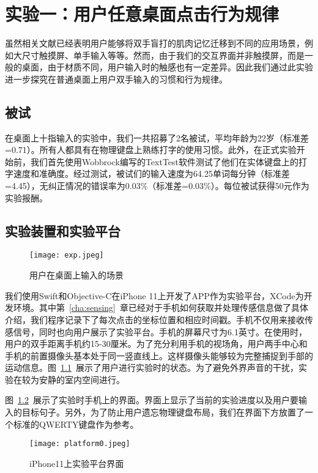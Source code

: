 \chapter{实验一：用户任意桌面点击行为规律}
\label{cha:exp1}
虽然相关文献已经表明用户能够将双手盲打的肌肉记忆迁移到不同的应用场景，例如大尺寸触摸屏、单手输入等等。然而，由于我们的交互界面并非触摸屏，而是一般的桌面，由于材质不同，用户输入时的触感也有一定差异。因此我们通过此实验进一步探究在普通桌面上用户双手输入的习惯和行为规律。


\section{被试}
在桌面上十指输入的实验中，我们一共招募了2名被试，平均年龄为22岁（标准差=0.71）。所有人都具有在物理键盘上熟练打字的使用习惯。此外，在正式实验开始前，我们首先使用Wobbrock编写的TextTest软件\cite{texttest}\cite{wobbrock2006analyzing}测试了他们在实体键盘上的打字速度和准确度。经过测试，被试们的输入速度为64.25单词每分钟（标准差=4.45），无纠正情况的错误率为0.03\%（标准差=0.03\%）。每位被试获得50元作为实验报酬。

\section{实验装置和实验平台}
\begin{figure}[h] %
    \centering
    \texttt{[image: exp.jpeg]}
    \caption{用户在桌面上输入的场景}
    \label{fig:exp}
\end{figure}
我们使用Swift和Objective-C在iPhone 11上开发了APP作为实验平台，XCode为开发环境。其中第~\ref{cha:sensing}~章已经对于手机如何获取并处理传感信息做了具体介绍，我们程序记录下了每次点击的坐标位置和相应时间戳。手机不仅用来接收传感信号，同时也向用户展示了实验平台。手机的屏幕尺寸为6.1英寸。在使用时，用户的双手距离手机约15-30厘米。为了充分利用手机的视场角，用户两手中心和手机的前置摄像头基本处于同一竖直线上。这样摄像头能够较为完整捕捉到手部的运动信息。图~\ref{fig:exp}~展示了用户进行实验时的状态。为了避免外界声音的干扰，实验在较为安静的室内空间进行。

图~\ref{fig:platform0}~展示了实验时手机上的界面。界面上显示了当前的实验进度以及用户要输入的目标句子。另外，为了防止用户遗忘物理键盘布局，我们在界面下方放置了一个标准的QWERTY键盘作为参考。

\begin{figure}[h] %
    \centering
    \texttt{[image: platform0.jpeg]}
    \caption{iPhone11上实验平台界面}
    \label{fig:platform0}
\end{figure}

